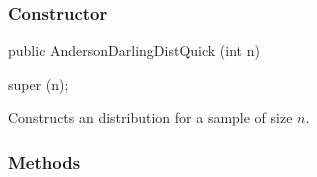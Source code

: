 \subsubsection* {Constructor}

\begin{code}

   public AndersonDarlingDistQuick (int n)\begin{hide} {
      super (n);
   }\end{hide}
\end{code}
\begin{tabb}
   Constructs an \ad{} distribution for a sample of size $n$.
\end{tabb}

\subsubsection* {Methods}

